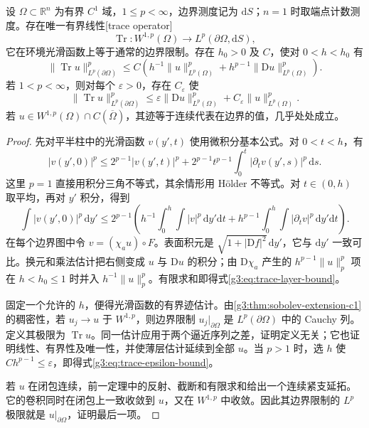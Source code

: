 \begin{theorem}\label{g3:thm:sobolev-trace}
	设 \(\Omega\subset\mathbb R^n\) 为有界 \(C^1\) 域，\(1\le p<\infty\)，边界测度记为 \(\mathrm dS\)；\(n=1\) 时取端点计数测度。存在唯一有界线性[trace operator]
	\[
		\operatorname{Tr}:W^{1,p}(\Omega)\longrightarrow L^p(\partial\Omega,\mathrm dS),
	\]
	它在环境光滑函数上等于通常的边界限制。存在 \(h_0>0\) 及 \(C\)，使对 \(0<h<h_0\) 有
	\begin{equation}\label{g3:eq:trace-layer-bound}
		\|\operatorname{Tr}u\|_{L^p(\partial\Omega)}^p
		\le C\left(h^{-1}\|u\|_{L^p(\Omega)}^p
		+h^{p-1}\|\mathrm Du\|_{L^p(\Omega)}^p\right).
	\end{equation}
	若 \(1<p<\infty\)，则对每个 \(\varepsilon>0\)，存在 \(C_\varepsilon\) 使
	\begin{equation}\label{g3:eq:trace-epsilon-bound}
		\|\operatorname{Tr}u\|_{L^p(\partial\Omega)}^p
		\le\varepsilon\|\mathrm Du\|_{L^p(\Omega)}^p
		+C_\varepsilon\|u\|_{L^p(\Omega)}^p.
	\end{equation}
	若 \(u\in W^{1,p}(\Omega)\cap C(\overline\Omega)\)，其迹等于连续代表在边界的值，几乎处处成立。
\end{theorem}
\begin{proof}
	先对平半柱中的光滑函数 \(v(y',t)\) 使用微积分基本公式。对 \(0<t<h\)，有
	\[
		|v(y',0)|^p
		\le2^{p-1}|v(y',t)|^p
		+2^{p-1}t^{p-1}\int_0^t|\partial_t v(y',s)|^p\,\mathrm ds.
	\]
	这里 \(p=1\) 直接用积分三角不等式，其余情形用 Hölder 不等式。对 \(t\in(0,h)\) 取平均，再对 \(y'\) 积分，得到
	\[
		\int|v(y',0)|^p\,\mathrm dy'
		\le2^{p-1}\left(h^{-1}\int_0^h\!\int|v|^p\,\mathrm dy'\mathrm dt
		+h^{p-1}\int_0^h\!\int|\partial_t v|^p\,\mathrm dy'\mathrm dt\right).
	\]
	在每个边界图中令 \(v=(\chi_a u)\circ F\)。表面积元是 \(\sqrt{1+|\mathrm Df|^2}\,\mathrm dy'\)，它与 \(\mathrm dy'\) 一致可比。换元和乘法估计把右侧变成 \(u\) 与 \(\mathrm Du\) 的积分；由 \(\mathrm D\chi_a\) 产生的 \(h^{p-1}\|u\|_p^p\) 项在 \(h<h_0\le1\) 时并入 \(h^{-1}\|u\|_p^p\)。有限求和即得式\eqref{g3:eq:trace-layer-bound}。

	固定一个允许的 \(h\)，便得光滑函数的有界迹估计。由\cref{g3:thm:sobolev-extension-c1}的稠密性，若 \(u_j\to u\) 于 \(W^{1,p}\)，则边界限制 \(u_j|_{\partial\Omega}\) 是 \(L^p(\partial\Omega)\) 中的 Cauchy 列。定义其极限为 \(\operatorname{Tr}u\)。同一估计应用于两个逼近序列之差，证明定义无关；它也证明线性、有界性及唯一性，并使薄层估计延续到全部 \(u\)。当 \(p>1\) 时，选 \(h\) 使 \(Ch^{p-1}\le\varepsilon\)，即得式\eqref{g3:eq:trace-epsilon-bound}。

	若 \(u\) 在闭包连续，前一定理中的反射、截断和有限求和给出一个连续紧支延拓。它的卷积同时在闭包上一致收敛到 \(u\)，又在 \(W^{1,p}\) 中收敛。因此其边界限制的 \(L^p\) 极限就是 \(u|_{\partial\Omega}\)，证明最后一项。
\end{proof}

